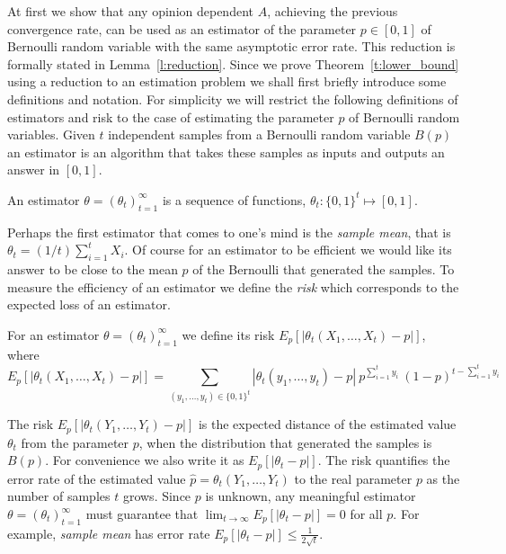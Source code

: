 At first we show that any opinion dependent $A$, achieving the previous
convergence rate, can be used as an estimator of the parameter
$p \in [0,1] $ of Bernoulli random variable with the same asymptotic error
rate. This reduction is formally stated in Lemma~\ref{l:reduction}.
Since we prove Theorem~\ref{t:lower_bound} using a reduction to
an estimation problem we shall first briefly introduce some definitions and
notation. For simplicity we will restrict the following definitions
of estimators and risk to the case of estimating the parameter $p$ of Bernoulli
random variables.
Given $t$ independent samples from a Bernoulli random variable $B(p)$
an estimator is an algorithm that takes these samples as inputs and
outputs an answer in $[0,1]$.
\begin{definition}\label{d:estimator}
  An estimator $\theta=(\theta_t)_{t=1}^{\infty}$
  is a sequence of functions, $\theta_t: \{0,1\}^t\mapsto [0,1]$.
\end{definition}
Perhaps the first estimator that comes to one's mind is the
\emph{sample mean}, that is $\theta_t=(1/t) \sum_{i=1}^t X_i$.
Of course for an estimator to be efficient we would like its answer to be
close to the mean $p$ of the Bernoulli that generated the samples.
To measure the efficiency of an estimator we define the \emph{risk}
which corresponds to the expected loss of an estimator.
\begin{definition}\label{d:risk}
  For an estimator $\theta =(\theta_t)_{t=1}^\infty$ we define
  its risk
  $E_p[|\theta_t(X_1,\ldots,X_t) - p|]$,
  where
  \[
    E_p[|\theta_t(X_1,\ldots,X_t) - p|]
    = \sum_{(y_1,\ldots,y_t)\in\{0,1\}^t}
    |\theta_t(y_1,\ldots,y_t) -p|\
    p^{\sum_{i=1}^t y_i}\ (1-p)^{t-\sum_{i=1}^t y_i}
  \]
\end{definition}
The risk $E_p[|\theta_t(Y_1,\ldots,Y_t) - p|]$ is the expected distance
of the estimated value $\theta_t$ from the parameter $p$, when the
distribution that generated the samples is $B(p)$.
For convenience we also write it as $E_p[|\theta_t - p|]$.
The risk quantifies the error rate of
the estimated value $\hat{p} =\theta_t(Y_1,\ldots,Y_t)$ to the
real parameter $p$ as the number of samples $t$ grows.
Since $p$ is unknown, any meaningful estimator $\theta=(\theta_t)_{t=1}^\infty$
must guarantee that $\lim_{t \to \infty} E_p[|\theta_t - p|]=0$ for all $p$.
For example, \emph{sample mean} has error rate
$E_p[|\theta_t-p|] \leq \frac{1}{2\sqrt{t}}$.

